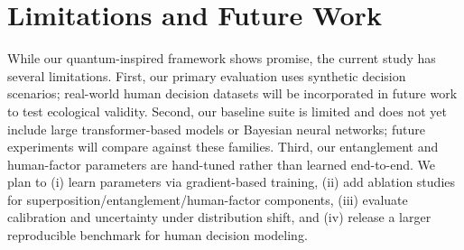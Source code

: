 \section{Limitations and Future Work}
While our quantum-inspired framework shows promise, the current study has several limitations.
First, our primary evaluation uses synthetic decision scenarios; real-world human decision datasets will
be incorporated in future work to test ecological validity. Second, our baseline suite is limited and
does not yet include large transformer-based models or Bayesian neural networks; future experiments will
compare against these families. Third, our entanglement and human-factor parameters are hand-tuned rather
than learned end-to-end. We plan to (i) learn parameters via gradient-based training, (ii) add ablation
studies for superposition/entanglement/human-factor components, (iii) evaluate calibration and
uncertainty under distribution shift, and (iv) release a larger reproducible benchmark for human decision modeling.